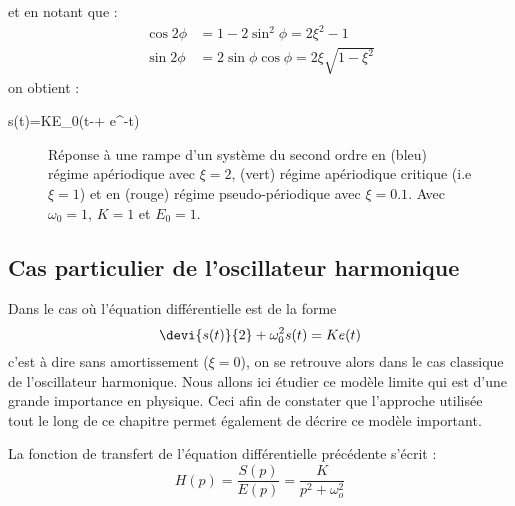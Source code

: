 et en notant que :
\begin{align*}
    \cos{2\phi}&=1-2\sin^2\phi=2\xi^2-1\\
    \sin{2\phi}&=2\sin\phi\cos\phi=2\xi\sqrt{1-\xi^2}
\end{align*}
on obtient :
\begin{bequation}
s(t)=KE_0\left(t-+
	     e^{-\alpha t}\right)
\end{bequation}
\begin{figure}[!t]
    \centering
    
    \caption{Réponse à une rampe d'un système du second ordre en 
            (bleu) régime apériodique avec $\xi=2$, 
            (vert) régime apériodique critique (i.e $\xi=1$) et en 
            (rouge) régime pseudo-périodique avec $\xi=0.1$. 
            Avec $\omega_0=1$, $K=1$ et $E_0=1$. \label{fig-2nd_ramp}}
\end{figure}
\subsection{Cas particulier de l'oscillateur harmonique}
Dans le cas où l'équation différentielle est de la forme 
\[
\devi{s(t)}{2}+\omega_0^2 s(t)=Ke(t)
\]
c'est à dire sans amortissement ($\xi=0$), on se retrouve alors dans le 
cas classique de l'oscillateur harmonique.
Nous allons ici étudier ce modèle limite qui est d'une grande importance 
en physique. Ceci afin de constater que l'approche utilisée tout le long de 
ce chapitre permet également de décrire ce modèle important. 

La fonction de transfert de l'équation différentielle précédente s'écrit :
\[
H(p)=\dfrac{S(p)}{E(p)}=\dfrac{K}{p^2+\omega_o^2}
\]
